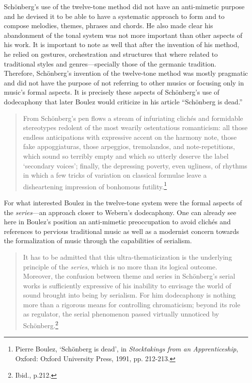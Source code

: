 Sch\"{o}nberg's use of the twelve-tone method did not have an anti-mimetic purpose and he devised it to be able to have a systematic approach to form and to compose melodies, themes, phrases and chords. He also made clear his abandonment of the tonal system was not more important than other aspects of his work. It is important to note as well that after the invention of his method, he relied on gestures, orchestration and structures that where related to traditional styles and genres---specially those of the germanic tradition. Therefore, Sch\"{o}nberg's invention of the twelve-tone method was mostly pragmatic and did not have the purpose of not referring to other musics or focusing only in music's formal aspects. It is precisely these aspects of Sch\"{o}nberg's use of dodecaphony that later Boulez would criticize in his article ``Sch\"{o}nberg is dead.''
\begin{quote}
From Sch\"{o}nberg's pen flows a stream of infuriating clich\'{e}s and formidable stereotypes redolent of the most wearily ostentatious romanticism: all those endless anticipations with expressive accent on the harmony note, those fake appoggiaturas, those arpeggios, tremolandos, and note-repetitions, which sound so terribly empty and which so utterly deserve the label `secondary voices'; finally, the depressing poverty, even ugliness, of rhythms in which a few tricks of variation on classical formulae leave a disheartening impression of bonhomous futility.\footnote{Pierre Boulez, `Sch\"{o}nberg is dead', in \emph{Stocktakings from an Apprenticeship}, Oxford: Oxford University Press, 1991, pp. 212-213.}
\end{quote}
For what interested Boulez in the twelve-tone system were the formal aspects of the \emph{series}---an approach closer to Webern's dodecaphony. One can already see here in Boulez's position an anti-mimetic preoccupation to avoid clich\'{e}s and references to pervious traditional music as well as a modernist concern towards the formalization of music through the capabilities of serialism.

\begin{quote}
It has to be admitted that this ultra-thematicization is the underlying principle of the \emph{series}, which is no more than its logical outcome. Moreover, the confusion between theme and series in Sch\"{o}nberg's serial works is sufficiently expressive of his inability to envisage the world of sound brought into being by serialism. For him dodecaphony is nothing more than a rigorous means for controlling chromaticism; beyond its role as regulator, the serial phenomenon passed virtually unnoticed by Sch\"{o}nberg.\footnote{Ibid., p.212.}
\end{quote}


